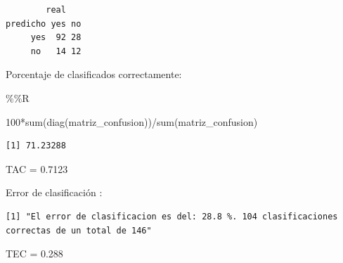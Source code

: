 \documentclass[
  11pt,
  a4paper,
]{article}
\newenvironment{Shaded}{\begin{snugshade}}{\end{snugshade}}
\newcommand{\DecValTok}[1]{\textcolor[rgb]{0.00,0.00,0.81}{#1}}
\newcommand{\FunctionTok}[1]{\textcolor[rgb]{0.00,0.00,0.00}{#1}}
\newcommand{\NormalTok}[1]{#1}
\newcommand{\OtherTok}[1]{\textcolor[rgb]{0.56,0.35,0.01}{#1}}
\newcommand{\SpecialCharTok}[1]{\textcolor[rgb]{0.00,0.00,0.00}{#1}}
\newcommand{\StringTok}[1]{\textcolor[rgb]{0.31,0.60,0.02}{#1}}
\begin{document}
\begin{verbatim}
        real
predicho yes no
     yes  92 28
     no   14 12
\end{verbatim}

\vspace{0.5cm}

Porcentaje de clasificados correctamente:

\begin{Shaded}
\begin{Highlighting}[]
\SpecialCharTok{\%\%}\NormalTok{R}

\DecValTok{100}\SpecialCharTok{*}\FunctionTok{sum}\NormalTok{(}\FunctionTok{diag}\NormalTok{(matriz\_confusion))}\SpecialCharTok{/}\FunctionTok{sum}\NormalTok{(matriz\_confusion)}
\end{Highlighting}
\end{Shaded}

\begin{verbatim}
[1] 71.23288
\end{verbatim}

TAC = 0.7123

\newpage

Error de clasificación :

\begin{Shaded}
\end{Shaded}

\begin{verbatim}
[1] "El error de clasificacion es del: 28.8 %. 104 clasificaciones correctas de un total de 146"
\end{verbatim}

TEC = 0.288

\vspace{1cm}
\end{document}
